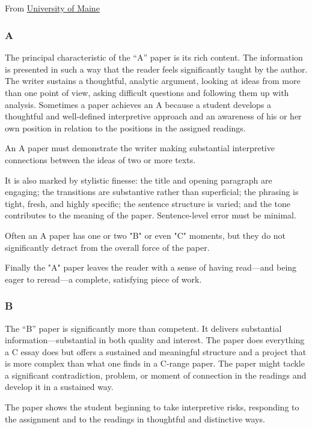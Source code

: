 \documentclass{article}
\begin{document}
\subsection{}
From \href{http://www.usm.maine.edu/eng/100APaperCPaper.htm}{University of Maine}
\subsubsection{A}
The principal characteristic of the ``A'' paper is its rich content. The information is presented in such a way that the reader feels significantly taught by the author.  The writer sustains a thoughtful, analytic argument, looking at ideas from more than one point of view, asking difficult questions and following them up with analysis.  Sometimes a paper achieves an A because a student develops a thoughtful and well-defined interpretive approach and an awareness of his or her own position in relation to the positions in the assigned readings.

An A paper must demonstrate the writer making substantial interpretive connections between the ideas of two or more texts.

It is also marked by stylistic finesse: the title and opening paragraph are engaging; the transitions are substantive rather than superficial; the phrasing is tight, fresh, and highly specific; the sentence structure is varied; and the tone contributes to the meaning of the paper. Sentence-level error must be minimal.

Often an A paper has one or two "B" or even "C" moments, but they do not significantly detract from the overall force of the paper.

Finally the "A" paper leaves the reader with a sense of having read—and being eager to reread—a complete, satisfying piece of work.

\subsubsection{B}
The ``B'' paper is significantly more than competent. It delivers substantial information—substantial in both quality and interest. The paper does everything a C essay does but offers a sustained and meaningful structure and a project that is more complex than what one finds in a C-range paper. The paper might tackle a significant contradiction, problem, or moment of connection in the readings and develop it in a sustained way.

The paper shows the student beginning to take interpretive risks, responding to the assignment and to the readings in thoughtful and distinctive ways.
\end{document}
